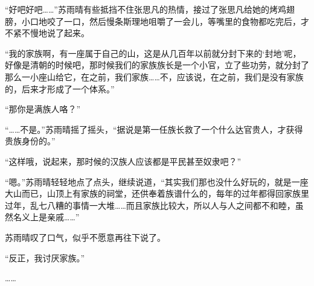 “好吧好吧……”苏雨晴有些抵挡不住张思凡的热情，接过了张思凡给她的烤鸡翅膀，小口地咬了一口，然后慢条斯理地咀嚼了一会儿，等嘴里的食物都吃完后，才不紧不慢地说了起来。

“我的家族啊，有一座属于自己的山，这是从几百年以前就分封下来的‘封地’呢，好像是清朝的时候吧，那时候我们的家族族长是一个小官，立了些功劳，就分封了那么一小座山给它，在之前，我们家族……不，应该说，在之前，我们是没有家族的，后来才形成了一个体系。”

“那你是满族人咯？”

“……不是。”苏雨晴摇了摇头，“据说是第一任族长救了一个什么达官贵人，才获得贵族身份的。”

“这样哦，说起来，那时候的汉族人应该都是平民甚至奴隶吧？”

“嗯。”苏雨晴轻轻地点了点头，继续说道，“其实我们那也没什么好玩的，就是一座大山而已，山顶上有家族的祠堂，还供奉着族谱什么的，每年的过年都得回家族里过年，乱七八糟的事情一大堆……而且家族比较大，所以人与人之间都不和睦，虽然名义上是亲戚……”

苏雨晴叹了口气，似乎不愿意再往下说了。

“反正，我讨厌家族。”

……
